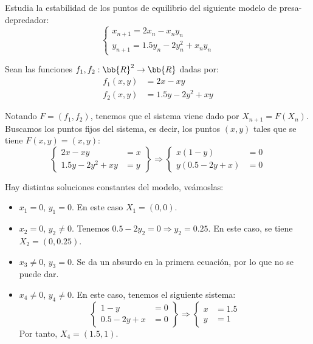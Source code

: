 \begin{ejercicio}
    Estudia la estabilidad de los puntos de equilibrio del siguiente modelo de presa-depredador:
    \begin{equation*}
        \begin{cases}
            x_{n+1} = 2x_n - x_n y_n\\
            y_{n+1} = 1.5y_n - 2y_n^2 + x_n y_n
        \end{cases}
    \end{equation*}

    Sean las funciones $f_1, f_2:\bb{R}^2\to\bb{R}$ dadas por:
    \begin{align*}
        f_1(x,y) &= 2x - xy\\
        f_2(x,y) &= 1.5y - 2y^2 + xy
    \end{align*}

    Notando $F=(f_1,f_2)$, tenemos que el sistema viene dado por $X_{n+1} = F(X_n)$.
    Buscamos los puntos fijos del sistema, es decir, los puntos $(x,y)$ tales que se tiene $F(x,y) = (x,y)$:
    \begin{equation*}
        \left\{
            \begin{array}{lr}
                2x - xy &= x\\
                1.5y - 2y^2 + xy &= y
            \end{array}
        \right\}
        \Longrightarrow
        \left\{
            \begin{array}{lr}
                x(1 - y) &=0\\
                y(0.5 - 2y + x) &=0
            \end{array}
        \right.
    \end{equation*}

    Hay distintas soluciones constantes del modelo, veámoslas:
    \begin{itemize}
        \item $x_1=0$, $y_1=0$. En este caso $X_1=(0,0)$.
        \item $x_2=0$, $y_2\neq 0$. Tenemos $0.5-2y_2=0\Longrightarrow y_2=0.25$. En este caso, se tiene $X_2=(0,0.25)$.
        \item $x_3\neq 0$, $y_3=0$. Se da un absurdo en la primera ecuación, por lo que no se puede dar.
        \item $x_4\neq 0$, $y_4\neq 0$. En este caso, tenemos el siguiente sistema:
        \begin{equation*}
            \left\{
                \begin{array}{lr}
                    1 - y &=0\\
                    0.5 - 2y + x &=0
                \end{array}
            \right\}
            \Longrightarrow
            \left\{
                \begin{array}{lr}
                    x &=1.5\\
                    y &=1
                \end{array}
            \right.
        \end{equation*}
        Por tanto, $X_4=(1.5,1)$.
    \end{itemize}


\end{ejercicio}
